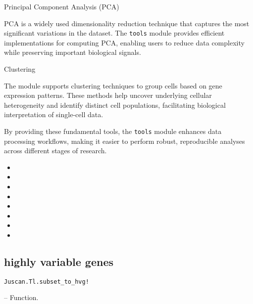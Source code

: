 \documentclass[oneside]{memoir}
\begin{document}
Principal Component Analysis (PCA)



PCA is a widely used dimensionality reduction technique that captures the most significant variations in the dataset. The \texttt{tools} module provides efficient implementations for computing PCA, enabling users to reduce data complexity while preserving important biological signals.



Clustering



The module supports clustering techniques to group cells based on gene expression patterns. These methods help uncover underlying cellular heterogeneity and identify distinct cell populations, facilitating biological interpretation of single-cell data.



By providing these fundamental tools, the \texttt{tools} module enhances data processing workflows, making it easier to perform robust, reproducible analyses across different stages of research.


\begin{itemize}
\item {}
\item {}
\item {}
\item {}
\item {}
\item {}
\item {}
\item {}
\end{itemize}


\subsection{highly variable genes}



\label{12942813836945218660}{}

\hypertarget{16728183197657460238}{\texttt{Juscan.Tl.subset\_to\_hvg!}}  -- {Function.}
\end{document}
